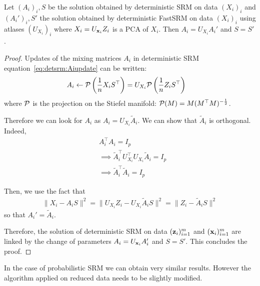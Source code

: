 \documentclass{article}
\begin{document}
\begin{proposition}
  Let $(A_i)_i, S$ be the solution obtained by deterministic SRM on data
  $(X_i)_i$ and $(A_i')_i, S'$ the solution obtained by deterministic FastSRM on
  data $(X_i)_i$ using atlases $(U_{X_i})_i$ where $X_i = U_{\mathbf{x}_i} Z_i$ is a PCA
  of $X_i$.
  Then $A_i = U_{X_i}A_i'$ and $S = S'$.
  
\label{prop:optimaldetsrm}
\end{proposition}
\begin{proof}
Updates of the mixing matrices $A_i$ in deterministic SRM
equation~\eqref{eq:detsrm:Aiupdate} can be written:
\begin{align}
  A_i &\leftarrow \mathcal{P} \left(\frac1{n}X_i S^{\top} \right)= U_{X_i}\mathcal{P} \left(\frac1{n}Z_i S^{\top} \right)
  \label{eq:fastdetsrm:Aiupdate}
\end{align}
where $\mathcal{P}$ is the projection on the Stiefel manifold: $\mathcal{P}(M) = M
(M^{\top}M)^{-\frac12}$.
%

Therefore we can look for $A_i$ as $A_i = U_{X_i} \tilde{A}_i$.
%
We can show that $\tilde{A}_i$ is orthogonal.
%
Indeed,
\begin{align}
  &A_i^{\top} A_i = I_p \\
  & \implies \tilde{A}_i^{\top}U_{X_i}^{\top} U_{X_i} \tilde{A}_i = I_p \\
  & \implies \tilde{A}_i^{\top} \tilde{A}_i = I_p
\end{align}

Then, we use the fact that
\begin{align}
  \|X_i - A_i S \|^2 = \| U_{X_i}Z_i - U_{X_i}\tilde{A}_i S\|^2 = \| Z_i - \tilde{A}_i S \|^2
  \label{eq:equality:xy}
\end{align}
so that $A_i' = \tilde{A}_i$.
%


Therefore, the solution of deterministic SRM on data $(\mathbf{z}_i)_{i=1}^m$ and
$(\mathbf{x}_i)_{i=1}^m$ are linked by the change of parameters $A_i = U_{\mathbf{x}_i}A_i'$ and
$S = S'$.
%
This concludes the proof.
%

\end{proof}

In the case of probabilistic SRM we can obtain very similar results.
%
However the
algorithm applied on reduced data needs to be slightly modified.
%
\end{document}
